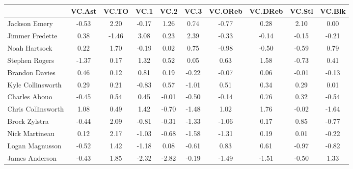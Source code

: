 \documentclass[10pt,letterpaper]{article}
\begin{document}
\begin{table}[ht]
\begin{center}
\begin{tabular}{lccccccccc}
  \hline
 & VC.Ast & VC.TO & VC.1 & VC.2 & VC.3 & VC.OReb & VC.DReb & VC.Stl & VC.Blk \\ 
  \hline
Jackson Emery & -0.53 & 2.20 & -0.17 & 1.26 & 0.74 & -0.77 & 0.28 & 2.10 & 0.00 \\ 
  Jimmer Fredette & 0.38 & -1.46 & 3.08 & 0.23 & 2.39 & -0.33 & -0.14 & -0.15 & -0.21 \\ 
  Noah Hartsock & 0.22 & 1.70 & -0.19 & 0.02 & 0.75 & -0.98 & -0.50 & -0.59 & 0.79 \\ 
  Stephen Rogers & -1.37 & 0.17 & 1.32 & 0.52 & 0.05 & 0.63 & 1.58 & -0.73 & 0.41 \\ 
  Brandon Davies & 0.46 & 0.12 & 0.81 & 0.19 & -0.22 & -0.07 & 0.06 & -0.01 & -0.13 \\ 
  Kyle Collinsworth & 0.29 & 0.21 & -0.83 & 0.57 & -1.01 & 0.51 & 0.34 & 0.29 & 0.01 \\ 
  Charles Abouo & -0.45 & 0.54 & 0.45 & -0.01 & -0.50 & -0.14 & 0.76 & 0.32 & -0.54 \\ 
  Chris Collinsworth & 1.08 & 0.49 & 1.42 & -0.70 & -1.48 & 1.02 & 1.76 & -0.02 & -1.64 \\ 
  Brock Zylstra & -0.44 & 2.09 & -0.81 & -0.31 & -1.33 & -1.06 & 0.17 & 0.85 & -0.77 \\ 
  Nick Martineau & 0.12 & 2.17 & -1.03 & -0.68 & -1.58 & -1.31 & 0.19 & 0.01 & -0.22 \\ 
  Logan Magnusson & -0.52 & 1.42 & -1.18 & 0.08 & -0.61 & 0.83 & 0.61 & -0.97 & -0.82 \\ 
  James Anderson & -0.43 & 1.85 & -2.32 & -2.82 & -0.19 & -1.49 & -1.51 & -0.50 & 1.33 \\ 
   \hline
\end{tabular}
\end{center}
\end{table}
\end{document}
